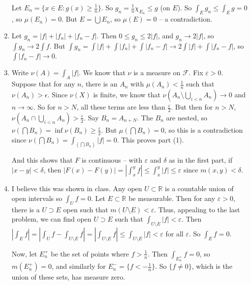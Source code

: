 \documentclass{article}
\newcommand\RR{\mathbb R}
\newcommand\F{\mathscr F}
\begin{document}
\begin{enumerate}
      Let $E_n = \{ x \in E : g(x) \geq \frac1n \}$. So $g_n = \frac1n\chi_{E_n}
      \leq g$ (on $E$). So $\int_E g_n \leq \int_E g = 0$, so $\mu(E_n) = 0$. But
      $E = \bigcup E_n$, so $\mu(E) = 0$ -- a contradiction.

   \item Let $g_n = |f| + |f_n| + |f_n - f|$. Then $0 \leq g_n \leq 2|f|$, and
      $g_n \to 2|f|$, so $\int g_n \to 2 \int f$. But $\int g_n = \int |f| +
      \int |f_n| + \int |f_n - f| \to 2 \int |f| + \int |f_n-f|$, so $\int |f_n
      - f| \to 0$.

   \item Write $\nu(A) = \int_A |f|$. We know that $\nu$ is a measure on $\F$.
      Fix $\varepsilon>0$. Suppose that for any $n$, there is an $A_n$ with
      $\mu(A_n) < \frac1n$ such that $\nu(A_n) > \epsilon$. Since $\nu(X)$ is
      finite, we know that $\nu(A_n \setminus \bigcup_{i<n} A_n) \to 0$ and $n
      \to \infty$. So for $n>N$, all these terms are less than
      $\frac\varepsilon2$. But then for $n>N$, $\nu(A_n \cap \bigcup_{i<n} A_n)
      > \frac\varepsilon2$. Say $B_n = A_{n+N}$. The $B_n$ are nested, so
      $\nu(\bigcap B_n) = \inf \nu(B_n) \geq \frac\varepsilon2$. But
      $\mu(\bigcap B_n) = 0$, so this is a contradiction since $\nu(\bigcap B_n)
      = \int_{(\bigcap B_n)} |f| = 0$. This proves part (1).

      And this shows that $F$ is continuous -- with $\varepsilon$ and $\delta$
      as in the first part, if $|x-y| < \delta$, then $|F(x) - F(y)| = |\int_x^y
      f| \leq \int_x^y |f| \leq \varepsilon$ since $m(x,y) < \delta$.

   \item I believe this was shown in class. Any open $U \subset \RR$ is a
      countable union of open intervals so $\int_U f = 0$. Let $E \subset \RR$
      be measurable. Then for any $\varepsilon>0$, there is a $U \supset E$ open
      such that $m(U \setminus E) < \varepsilon$. Thus, appealing to the last
      problem, we can find open $U \supset E$ such that $\int_{U \setminus E}
      |f| < \varepsilon$. Then $|\int_E f| = |\int_U f - \int_{U \setminus E} f|
      = |\int_{U \setminus E} f| \leq \int_{U \setminus E} |f| < \varepsilon$
      for all $\varepsilon$. So $\int_E f = 0$.

      Now, let $E^+_n$ be the set of points where $f > \frac1n$. Then
      $\int_{E^+_n} f = 0$, so $m(E^+_n) = 0$, and similarly for $E^-_n = \{f <
      -\frac1n\}$. So $\{f \neq 0\}$, which is the union of these sets, has
      measure zero.

\end{enumerate}
\end{document}
